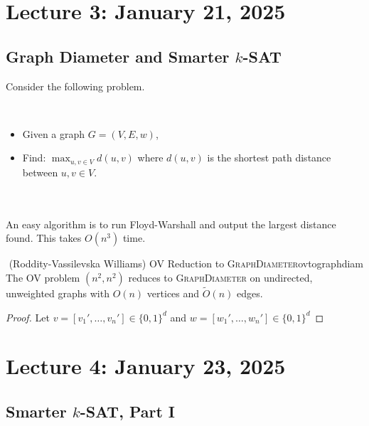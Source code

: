 \pagebreak
    
\section{Lecture 3: January 21, 2025}

    \subsection{Graph Diameter and Smarter \(k\)-SAT}

        Consider the following problem.
        \begin{compprob} \label{prob:graphdiam}
            \vphantom
            \\
            \begin{itemize}
                \item Given a graph \(G=(V,E,w)\), 
                \item Find: \(\max_{u,v\in V}d(u,v)\) where \(d(u,v)\) is the shortest path distance between \(u,v\in V\).
            \end{itemize}
            
        \end{compprob}
        \vphantom
        \\
        \\
        An easy algorithm is to run Floyd-Warshall and output the largest distance found. This takes \(O(n^3)\) time.
        \begin{theorem}{\Stop\,\,(Roddity-Vassilevska Williams) \textsc{OV} Reduction to \textsc{GraphDiameter}}{ovtographdiam}
            The \textsc{OV} problem \((n^2,n^2)\) reduces to \textsc{GraphDiameter} on undirected, unweighted graphs with \(O(n)\) vertices and \(\tilde{O}(n)\) edges.
            \begin{proof}
                Let \(v=[v_1',\ldots,v_n']\in\{0,1\}^d\) and \(w=[w_1',\ldots,w_n']\in \{0,1\}^d\)
            \end{proof}
        \end{theorem}



\pagebreak

\section{Lecture 4: January 23, 2025}

    \subsection{Smarter \(k\)-SAT, Part I}

